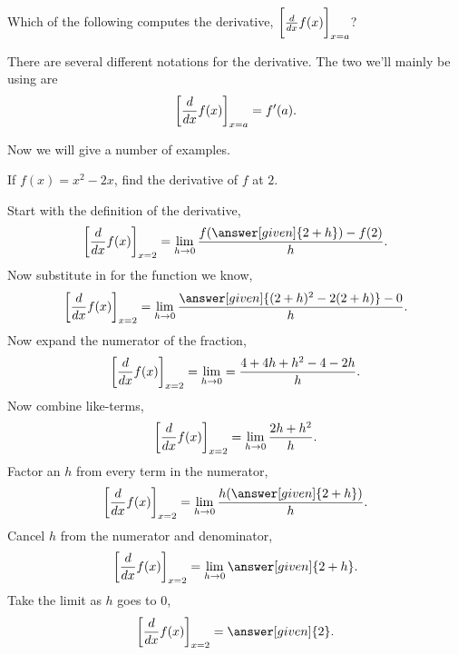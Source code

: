 \documentclass{ximera}
\begin{document}
\begin{question} 
    Which of the following computes the derivative, $\bigg[ \frac{d}{dx} f(x) \bigg]_{x=a}$?
    \begin{selectAll}
    \end{selectAll}
\end{question}


\begin{definition}
  There are several different notations for the derivative.  The two we'll mainly be using are
  \[
  \bigg[ \frac{d}{dx} f(x) \bigg]_{x=a} = f'(a).
  \]
\end{definition}


Now we will give a number of examples.
\begin{example}
  If $f(x) = x^2-2x$, find the derivative of $f$ at $2$.
  \begin{explanation}
    Start with the definition of the derivative,
    \[
    \eval{\ddx f(x)}_{x=2} = \lim_{h\to 0} \frac{f(\answer[given]{2+h})-f(2)}{h}.
    \] 
     Now substitute in for the function we know,
    \[
    \eval{\ddx f(x)}_{x=2} = \lim_{h\to 0}\frac{\answer[given]{(2+h)^2-2(2+h)} -0}{h}.
    \]
    Now expand the numerator of the fraction,
    \[
    \bigg[ \frac{d}{dx} f(x) \bigg]_{x=2} = \lim_{h\to 0} = \frac{4+4h+h^2-4-2h }{h}.
    \]
    Now combine like-terms,
    \[
    \bigg[ \frac{d}{dx} f(x) \bigg]_{x=2} = \lim_{h\to 0}\frac{2h+h^2}{h}.
    \]
    Factor an $h$ from every term in the numerator,
    \[
    \eval{\ddx f(x)}_{x=2} = \lim_{h\to 0}\frac{h(\answer[given]{2+h})}{h}.
    \]
    Cancel $h$ from the numerator and denominator,
    \[
    \eval{\ddx f(x)}_{x=2} = \lim_{h\to 0}\answer[given]{2+h}. 
    \]
    Take the limit as $h$ goes to $0$,
    \[
    \eval{\ddx f(x)}_{x=2} = \answer[given]{2}.
    \]
\end{explanation}
\end{example}
\end{document}
